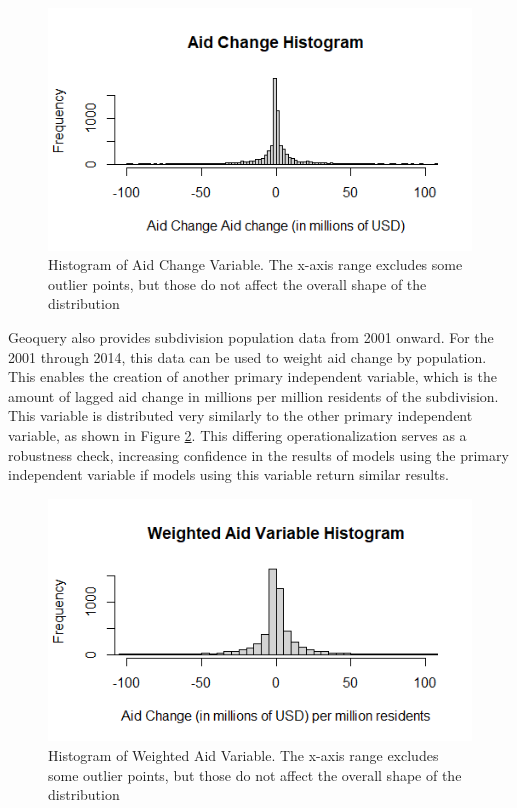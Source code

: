 \documentclass[12pt, letterpaper]{article}
\renewcommand{\cite}{\citep}
\begin{document}
	\begin{figure}
		\includegraphics[scale=1]{aidchangehist}
		\caption{Histogram of Aid Change Variable. The x-axis range excludes some outlier points, but those do not affect the overall shape of the distribution}
		\label{fig:aidchangehist}
	\end{figure}
	
	Geoquery also provides subdivision population data \cite{worldpop} from 2001 onward. For the 2001 through 2014, this data can be used to weight aid change by population. This enables the creation of another primary independent variable, which is the amount of lagged aid change in millions per million residents of the subdivision. This variable is distributed very similarly to the other primary independent variable, as shown in Figure \ref{fig:weightedaidhist}. This differing operationalization serves as a robustness check, increasing confidence in the results of models using the primary independent variable if models using this variable return similar results. 
	
		\begin{figure}
		\includegraphics[scale=1]{weightedaidhist}
		\caption{Histogram of Weighted Aid Variable. The x-axis range excludes some outlier points, but those do not affect the overall shape of the distribution}
		\label{fig:weightedaidhist}
	\end{figure}
	
\end{document}
